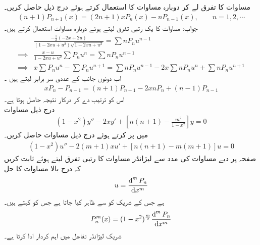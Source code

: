 مساوات  کا  تفرق لے کر دوبارہ مساوات  کا استعمال کرتے ہوئے  درج ذیل  حاصل کریں۔
\begin{align}
(n+1)P_{n+1}(x)=(2n+1)xP_n(x)-nP_{n-1}(x),\quad \quad n=1,2,\cdots
\end{align}
جواب: مساوات  کا یک رتبی تفرق  لیتے ہوئے دوبارہ مساوات  استعمال کرتے ہیں۔
\begin{align*}
& \frac{-\frac{1}{2}(-2x+2u)}{(1-2xu+u^2)\sqrt{1-2xu+u^2}}=\sum nP_nu^{n-1}\\
\implies & \frac{x-u}{1-2xu+u^2} \sum P_n u^n=\sum nP_n u^{n-1} \\
\implies & x\sum P_n u^n-\sum P_n u^{n+1}=\sum nP_n u^{n-1}-2x\sum nP_nu^n+\sum nP_nu^{n+1}
\end{align*}
اب دونوں جانب   کے عددی سر برابر لیتے ہیں ۔
\begin{align*}
xP_n-P_{n-1}=(n+1)P_{n+1}-2xnP_n+(n-1)P_{n-1}
\end{align*}
اس کو ترتیب دے کر درکار نتیجہ  حاصل ہوتا ہے۔
\quad {}\\
درج ذیل مساوات 
\begin{align}\label{مساوات_بیسل_شریک_لیژانڈر_الف}
(1-x^2)y''-2xy'+\left[n(n+1)-\frac{m^2}{1-x^2}\right]y=0
\end{align}
میں  پر کرتے ہوئے درج ذیل مساوات حاصل کریں۔
\begin{align}\label{مساوات_بیسل_شریک_لیژانڈر_ب}
(1-x^2)u''-2(m+1)xu'+[n(n+1)-m(m+1)]u=0
\end{align}
صفحہ  پر دیے مساوات  کی مدد سے لیژانڈر مساوات  کا  رتبی تفرق  لیتے ہوئے ثابت کریں کہ درج بالا مساوات کا حل
\begin{align*}
u=\frac{\dif^{\,m}P_n}{\dif x^m}
\end{align*}
ہے جس کے شریک  کو  سے ظاہر کیا جاتا ہے جس کو  کہتے ہیں۔
\begin{align}
P_n^m(x) =(1-x^2)^{\frac{m}{2}}\frac{\dif^{\,m}P_n}{\dif x^m}
\end{align}
شریک لیژانڈر تفاعل  میں اہم کردار ادا کرتا ہے۔

